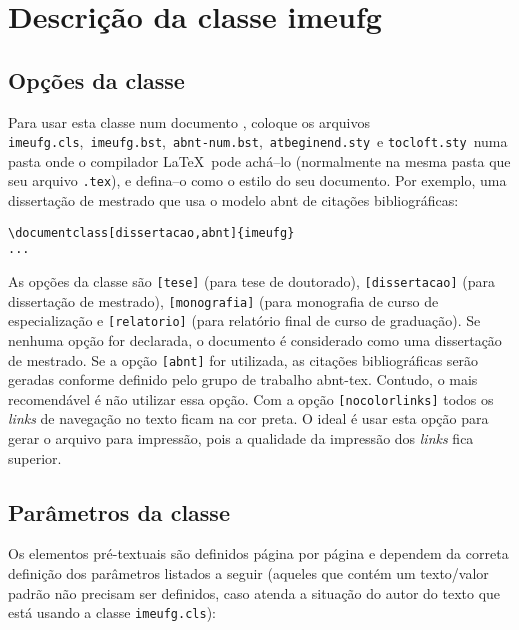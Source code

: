 \chapter{Descrição da classe \textsf{imeufg}}
\label{cap:descr}

\section{Opções da classe}
\label{sec:opcoes}
Para usar esta classe num documento \LaTeXe, coloque os arquivos 
\verb|imeufg.cls|,\ \verb|imeufg.bst|,\ \verb|abnt-num.bst|,\ \verb|atbeginend.sty|\ e \verb|tocloft.sty|\ numa pasta onde o compilador \LaTeX\ pode achá--lo (normalmente na mesma pasta que seu arquivo \verb|.tex|), e defina--o como o estilo do seu documento. Por exemplo, uma dissertação de mestrado que usa o modelo abnt de citações bibliográficas:
\begin{verbatim}
\documentclass[dissertacao,abnt]{imeufg}
...

\end{verbatim}

As opções da classe são \verb|[tese]| (para tese de doutorado), \verb|[dissertacao]| (para dissertação de mestrado), \verb|[monografia]| (para monografia de curso de especialização e \verb|[relatorio]| (para relatório final de curso de graduação). Se nenhuma opção for declarada, o documento é considerado como uma dissertação de mestrado. Se a opção \verb|[abnt]| for utilizada, as citações bibliográficas serão geradas conforme definido pelo grupo de trabalho \textsf{abnt-tex}. Contudo, o mais recomendável é não utilizar essa opção. Com a opção \verb|[nocolorlinks]| todos os {\em links} de navegação no texto ficam na cor preta. O ideal é usar esta opção para gerar o arquivo para impressão, pois a qualidade da impressão dos {\em links} fica superior.


\section{Parâmetros da classe}
\label{sec:param}
Os elementos pré-textuais são definidos página por página e dependem da correta definição dos parâmetros listados a seguir (aqueles que contém um texto/valor padrão não precisam ser definidos, caso atenda a situação do autor do texto que está usando a classe \verb|imeufg.cls|):

